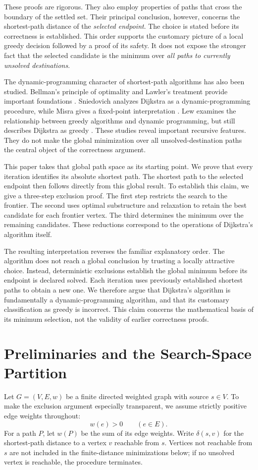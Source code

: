 \documentclass[11pt]{article}
\begin{document}
These proofs are rigorous. They also employ properties of paths that cross the boundary of the settled set. Their principal conclusion, however, concerns the shortest-path distance of the \emph{selected endpoint}. The choice is stated before its correctness is established. This order supports the customary picture of a local greedy decision followed by a proof of its safety. It does not expose the stronger fact that the selected candidate is the minimum over \emph{all paths to currently unsolved destinations}.

The dynamic-programming character of shortest-path algorithms has also been studied. Bellman's principle of optimality and Lawler's treatment provide important foundations \cite{Bellman1957,Lawler1976}. Sniedovich analyzes Dijkstra as a dynamic-programming procedure, while Misra gives a fixed-point interpretation \cite{Sniedovich2006,Misra2001}. Lew examines the relationship between greedy algorithms and dynamic programming, but still describes Dijkstra as greedy \cite{Lew2006}. These studies reveal important recursive features. They do not make the global minimization over all unsolved-destination paths the central object of the correctness argument.

This paper takes that global path space as its starting point. We prove that every iteration identifies its absolute shortest path. The shortest path to the selected endpoint then follows directly from this global result. To establish this claim, we give a three-step exclusion proof. The first step restricts the search to the frontier. The second uses optimal substructure and relaxation to retain the best candidate for each frontier vertex. The third determines the minimum over the remaining candidates. These reductions correspond to the operations of Dijkstra's algorithm itself.

The resulting interpretation reverses the familiar explanatory order. The algorithm does not reach a global conclusion by trusting a locally attractive choice. Instead, deterministic exclusions establish the global minimum before its endpoint is declared solved. Each iteration uses previously established shortest paths to obtain a new one. We therefore argue that Dijkstra's algorithm is fundamentally a dynamic-programming algorithm, and that its customary classification as greedy is incorrect. This claim concerns the mathematical basis of its minimum selection, not the validity of earlier correctness proofs.

\section{Preliminaries and the Search-Space Partition}
\label{sec:prelim}
Let $G=(V,E,w)$ be a finite directed weighted graph with source $s\in V$. To make the exclusion argument especially transparent, we assume strictly positive edge weights throughout:
\[
  w(e)>0\qquad (e\in E).
\]
For a path $P$, let $w(P)$ be the sum of its edge weights. Write $\delta(s,v)$ for the shortest-path distance to a vertex $v$ reachable from $s$. Vertices not reachable from $s$ are not included in the finite-distance minimizations below; if no unsolved vertex is reachable, the procedure terminates.
\end{document}
